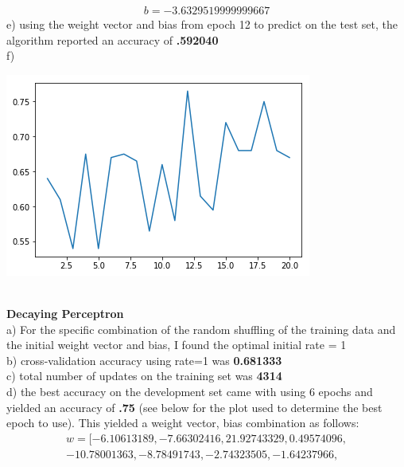 \documentclass[11pt,a4paper]{article}
\begin{document}
\begin{enumerate}
			\begin{gather}
				[-5.268682  , -6.708682  , 19.291318  ,  0.761318  , -9.648682  ,\\
       -8.948682  , -3.218682  ,  1.871318  ,  0.12729463, -0.08059336,\\
        1.05738386,  0.16120544,  3.12386446,  2.01868857,  0.9683586 ,\\
        0.46600629, -3.01700207, -0.73008194, -2.128682  ] \\
				b = -3.6329519999999667
			\end{gather}
			e) using the weight vector and bias from epoch 12 to predict on the test set, the algorithm reported an accuracy of \textbf{.592040} \\
			f)
			\begin{center}
				\includegraphics[width=0.7\linewidth]{simple_plot}
			\end{center}
			~\\
			\textbf{Decaying Perceptron}    \\
			a) For the specific combination of the random shuffling of the training data and the initial weight vector and bias, I found the optimal initial rate = 1  \\
			b) cross-validation accuracy using rate=1 was \textbf{0.681333}\\
			c) total number of updates on the training set was \textbf{4314}\\
			d) the best accuracy on the development set came with using 6 epochs and yielded an accuracy of \textbf{.75} (see below for the plot used to determine the best epoch to use). This yielded a weight vector, bias combination as follows:\\
			\begin{gather}
			w = [ -6.10613189,  -7.66302416,  21.92743329,   0.49574096,\\
       -10.78001363,  -8.78491743,  -2.74323505,  -1.64237966,\\

\end{gather}
\end{enumerate}
\end{document}
